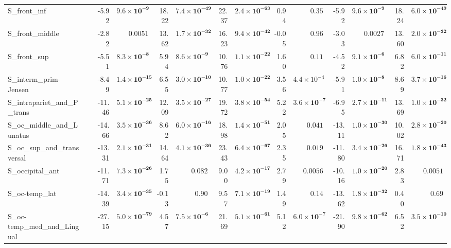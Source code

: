 {\begin{longtable}{llrrrrrrrrrrrr}
S\_front\_inf &  & -5.92 & $\mathbf{9.6{\times}10^{-9}}$ & 18.22 & $\mathbf{7.4{\times}10^{-49}}$ & 22.37 & $\mathbf{2.4{\times}10^{-63}}$ & 0.94 & $0.35$ & -5.92 & $\mathbf{9.6{\times}10^{-9}}$ & 18.24 & $\mathbf{6.0{\times}10^{-49}}$ \\
S\_front\_middle &  & -2.82 & $0.0051$ & 13.62 & $\mathbf{1.7{\times}10^{-32}}$ & 16.23 & $\mathbf{9.4{\times}10^{-42}}$ & -0.05 & $0.96$ & -3.03 & $0.0027$ & 13.60 & $\mathbf{2.0{\times}10^{-32}}$ \\
S\_front\_sup &  & -5.51 & $\mathbf{8.3{\times}10^{-8}}$ & 5.94 & $\mathbf{8.6{\times}10^{-9}}$ & 10.76 & $\mathbf{1.1{\times}10^{-22}}$ & 1.60 & $0.11$ & -4.52 & $\mathbf{9.1{\times}10^{-6}}$ & 6.82 & $\mathbf{6.0{\times}10^{-11}}$ \\
S\_interm\_prim-Jensen &  & -8.49 & $\mathbf{1.4{\times}10^{-15}}$ & 6.55 & $\mathbf{3.0{\times}10^{-10}}$ & 10.77 & $\mathbf{1.0{\times}10^{-22}}$ & 3.56 & $4.4{\times}10^{-4}$ & -5.91 & $\mathbf{1.0{\times}10^{-8}}$ & 8.69 & $\mathbf{3.7{\times}10^{-16}}$ \\
S\_intrapariet\_and\_P\_trans &  & -11.46 & $\mathbf{5.1{\times}10^{-25}}$ & 12.09 & $\mathbf{3.5{\times}10^{-27}}$ & 19.72 & $\mathbf{3.8{\times}10^{-54}}$ & 5.22 & $\mathbf{3.6{\times}10^{-7}}$ & -6.95 & $\mathbf{2.7{\times}10^{-11}}$ & 13.69 & $\mathbf{1.0{\times}10^{-32}}$ \\
S\_oc\_middle\_and\_Lunatus &  & -14.66 & $\mathbf{3.5{\times}10^{-36}}$ & 8.62 & $\mathbf{6.0{\times}10^{-16}}$ & 18.98 & $\mathbf{1.4{\times}10^{-51}}$ & 2.05 & $0.041$ & -13.11 & $\mathbf{1.0{\times}10^{-30}}$ & 10.02 & $\mathbf{2.8{\times}10^{-20}}$ \\
S\_oc\_sup\_and\_transversal &  & -13.31 & $\mathbf{2.1{\times}10^{-31}}$ & 14.64 & $\mathbf{4.1{\times}10^{-36}}$ & 23.43 & $\mathbf{6.4{\times}10^{-67}}$ & 2.35 & $0.019$ & -11.80 & $\mathbf{3.4{\times}10^{-26}}$ & 16.71 & $\mathbf{1.8{\times}10^{-43}}$ \\
S\_occipital\_ant &  & -11.71 & $\mathbf{7.3{\times}10^{-26}}$ & 1.75 & $0.082$ & 9.00 & $\mathbf{4.2{\times}10^{-17}}$ & 2.79 & $0.0056$ & -10.16 & $\mathbf{1.0{\times}10^{-20}}$ & 2.83 & $0.0051$ \\
S\_oc-temp\_lat &  & -14.39 & $\mathbf{3.4{\times}10^{-35}}$ & -0.13 & $0.90$ & 9.57 & $\mathbf{7.1{\times}10^{-19}}$ & 1.49 & $0.14$ & -13.62 & $\mathbf{1.8{\times}10^{-32}}$ & 0.40 & $0.69$ \\
S\_oc-temp\_med\_and\_Lingual &  & -27.15 & $\mathbf{5.0{\times}10^{-79}}$ & 4.57 & $\mathbf{7.5{\times}10^{-6}}$ & 21.69 & $\mathbf{5.1{\times}10^{-61}}$ & 5.12 & $\mathbf{6.0{\times}10^{-7}}$ & -21.90 & $\mathbf{9.8{\times}10^{-62}}$ & 6.52 & $\mathbf{3.5{\times}10^{-10}}$ \\

\end{longtable}}
